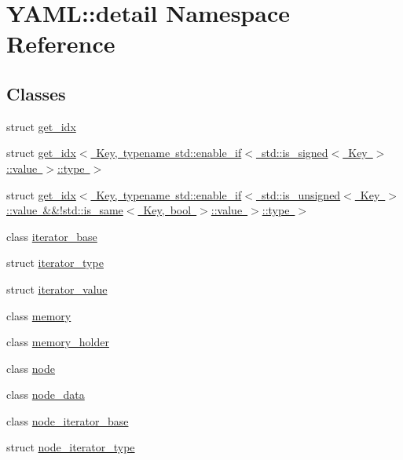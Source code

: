\hypertarget{namespace_y_a_m_l_1_1detail}{}\section{Y\+A\+ML\+::detail Namespace Reference}
\label{namespace_y_a_m_l_1_1detail}
\subsection*{Classes}
\begin{DoxyCompactItemize}
\item 
struct \mbox{\hyperlink{struct_y_a_m_l_1_1detail_1_1get__idx}{get\+\_\+idx}}
\item 
struct \mbox{\hyperlink{struct_y_a_m_l_1_1detail_1_1get__idx_3_01_key_00_01typename_01std_1_1enable__if_3_01std_1_1is__s88702b83581fef4d38e6abb882a529e6}{get\+\_\+idx$<$ Key, typename std\+::enable\+\_\+if$<$ std\+::is\+\_\+signed$<$ Key $>$\+::value $>$\+::type $>$}}
\item 
struct \mbox{\hyperlink{struct_y_a_m_l_1_1detail_1_1get__idx_3_01_key_00_01typename_01std_1_1enable__if_3_01std_1_1is__u08dca2a68e6a8b25fe3451a1a4ed02f5}{get\+\_\+idx$<$ Key, typename std\+::enable\+\_\+if$<$ std\+::is\+\_\+unsigned$<$ Key $>$\+::value \&\&!std\+::is\+\_\+same$<$ Key, bool $>$\+::value $>$\+::type $>$}}
\item 
class \mbox{\hyperlink{class_y_a_m_l_1_1detail_1_1iterator__base}{iterator\+\_\+base}}
\item 
struct \mbox{\hyperlink{struct_y_a_m_l_1_1detail_1_1iterator__type}{iterator\+\_\+type}}
\item 
struct \mbox{\hyperlink{struct_y_a_m_l_1_1detail_1_1iterator__value}{iterator\+\_\+value}}
\item 
class \mbox{\hyperlink{class_y_a_m_l_1_1detail_1_1memory}{memory}}
\item 
class \mbox{\hyperlink{class_y_a_m_l_1_1detail_1_1memory__holder}{memory\+\_\+holder}}
\item 
class \mbox{\hyperlink{class_y_a_m_l_1_1detail_1_1node}{node}}
\item 
class \mbox{\hyperlink{class_y_a_m_l_1_1detail_1_1node__data}{node\+\_\+data}}
\item 
class \mbox{\hyperlink{class_y_a_m_l_1_1detail_1_1node__iterator__base}{node\+\_\+iterator\+\_\+base}}
\item 
struct \mbox{\hyperlink{struct_y_a_m_l_1_1detail_1_1node__iterator__type}{node\+\_\+iterator\+\_\+type}}
\item 

\end{DoxyCompactItemize}
